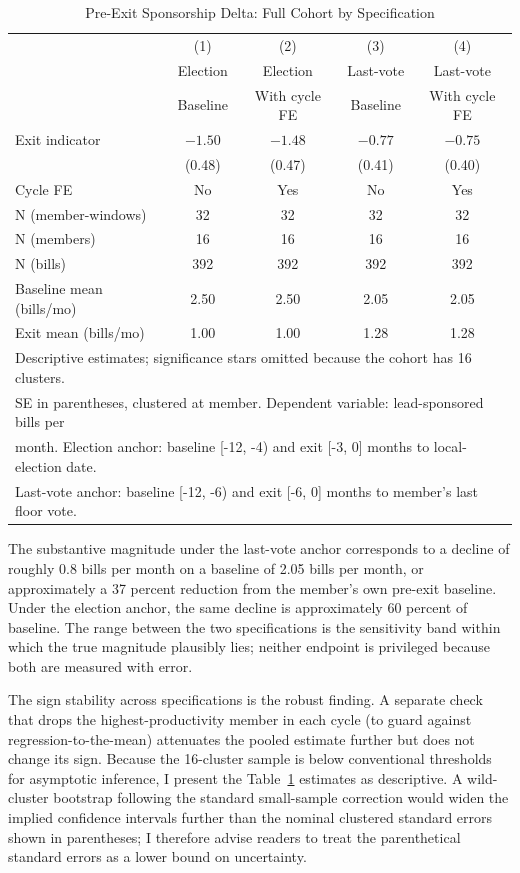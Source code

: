 \documentclass[11pt]{article}
\begin{document}
\begin{table}[H]
\centering
\caption{Pre-Exit Sponsorship Delta: Full Cohort by Specification}
\label{tab:main}
\begin{tabular}{lcccc}
\toprule
 & (1) & (2) & (3) & (4) \\
 & Election & Election & Last-vote & Last-vote \\
 & Baseline & With cycle FE & Baseline & With cycle FE \\
\midrule
Exit indicator & $-1.50$ & $-1.48$ & $-0.77$ & $-0.75$ \\
 & (0.48) & (0.47) & (0.41) & (0.40) \\
Cycle FE & No & Yes & No & Yes \\
\midrule
N (member-windows) & 32 & 32 & 32 & 32 \\
N (members) & 16 & 16 & 16 & 16 \\
N (bills) & 392 & 392 & 392 & 392 \\
Baseline mean (bills/mo) & 2.50 & 2.50 & 2.05 & 2.05 \\
Exit mean (bills/mo) & 1.00 & 1.00 & 1.28 & 1.28 \\
\bottomrule
\multicolumn{5}{l}{\footnotesize Descriptive estimates; significance stars omitted because the cohort has 16 clusters.} \\
\multicolumn{5}{l}{\footnotesize SE in parentheses, clustered at member. Dependent variable: lead-sponsored bills per} \\
\multicolumn{5}{l}{\footnotesize month. Election anchor: baseline [-12, -4) and exit [-3, 0] months to local-election date.} \\
\multicolumn{5}{l}{\footnotesize Last-vote anchor: baseline [-12, -6) and exit [-6, 0] months to member's last floor vote.} \\
\end{tabular}
\end{table}

The substantive magnitude under the last-vote anchor corresponds to a decline of roughly 0.8 bills per month on a baseline of 2.05 bills per month, or approximately a 37 percent reduction from the member's own pre-exit baseline. Under the election anchor, the same decline is approximately 60 percent of baseline. The range between the two specifications is the sensitivity band within which the true magnitude plausibly lies; neither endpoint is privileged because both are measured with error.

The sign stability across specifications is the robust finding. A separate check that drops the highest-productivity member in each cycle (to guard against regression-to-the-mean) attenuates the pooled estimate further but does not change its sign. Because the 16-cluster sample is below conventional thresholds for asymptotic inference, I present the Table~\ref{tab:main} estimates as descriptive. A wild-cluster bootstrap following the standard small-sample correction would widen the implied confidence intervals further than the nominal clustered standard errors shown in parentheses; I therefore advise readers to treat the parenthetical standard errors as a lower bound on uncertainty.
\end{document}
